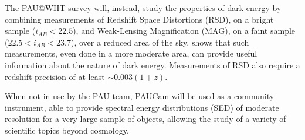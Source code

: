 The PAU@WHT survey will, instead, study the properties of dark energy by combining measurements of Redshift Space Distortions (RSD), on a bright sample ($i_{AB}<22.5$), and Weak-Lensing Magnification (MAG), on a faint sample ($22.5<i_{AB}<23.7$), over a reduced area of the sky. \citet{Gaztanaga2012} shows that such measurements, even done in a more moderate area, can provide useful information about the nature of dark energy. Measurements of RSD also require a redshift precision of at least $\sim 0.003(1+z)$. 

When not in use by the PAU team, PAUCam will be used as a community instrument, able to provide spectral energy distributions (SED) of moderate resolution for a very large sample of objects, allowing the study of a variety of scientific topics beyond cosmology. 
